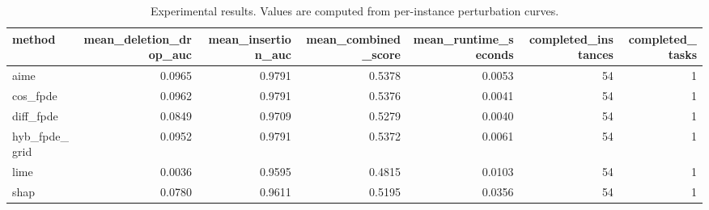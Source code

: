 \begin{table}[t]
\caption{Experimental results. Values are computed from per-instance perturbation curves.}
\label{tab:main_results_computed}
\centering
\begin{tabular}{lrrrrrr}
\toprule
method & mean\_deletion\_drop\_auc & mean\_insertion\_auc & mean\_combined\_score & mean\_runtime\_seconds & completed\_instances & completed\_tasks \\
\midrule
aime & 0.0965 & 0.9791 & 0.5378 & 0.0053 & 54 & 1 \\
cos\_fpde & 0.0962 & 0.9791 & 0.5376 & 0.0041 & 54 & 1 \\
diff\_fpde & 0.0849 & 0.9709 & 0.5279 & 0.0040 & 54 & 1 \\
hyb\_fpde\_grid & 0.0952 & 0.9791 & 0.5372 & 0.0061 & 54 & 1 \\
lime & 0.0036 & 0.9595 & 0.4815 & 0.0103 & 54 & 1 \\
shap & 0.0780 & 0.9611 & 0.5195 & 0.0356 & 54 & 1 \\
\bottomrule
\end{tabular}

\end{table}

